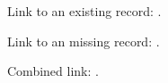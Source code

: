 \documentclass{article}
\begin{document}
Link to an existing record: \cite{Graham1995}.

Link to an missing record: \cite{MissingEntry2024}.

Combined link: \cite{Graham1995,MissingEntry2024,Thomas2008}.

\printbibliography
\end{document}
